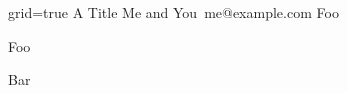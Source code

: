 \documentclass[landscape,paperwidth=180cm,paperheight=120cm]{baposter}
\begin{document}
\begin{poster}
  {grid=true}
  { } %
  {A Title} %
  {Me and You\ me@example.com} %
  { Foo } %
  
  \begin{posterbox}[name=contribution,column=0,row=0,span=2]{Foo}
  \end{posterbox}
  
  \begin{posterbox}[name=abstract,column=0,below=contribution]{Bar}
  \end{posterbox}
  
\end{poster}
\end{document}
